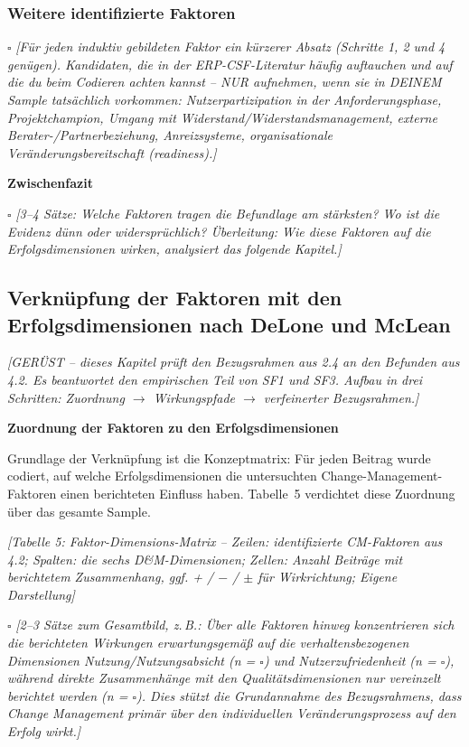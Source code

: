 \subsubsection{Weitere identifizierte Faktoren}

$\square$ \textit{[F\"ur jeden induktiv gebildeten Faktor ein k\"urzerer Absatz (Schritte 1, 2 und 4 gen\"ugen). Kandidaten, die in der ERP-CSF-Literatur h\"aufig auftauchen und auf die du beim Codieren achten kannst -- NUR aufnehmen, wenn sie in DEINEM Sample tats\"achlich vorkommen: Nutzerpartizipation in der Anforderungsphase, Projektchampion, Umgang mit Widerstand/Widerstandsmanagement, externe Berater-/Partnerbeziehung, Anreizsysteme, organisationale Ver\"anderungsbereitschaft (readiness).]}

\textbf{Zwischenfazit}

$\square$ \textit{[3--4 S\"atze: Welche Faktoren tragen die Befundlage am st\"arksten? Wo ist die Evidenz d\"unn oder widerspr\"uchlich? \"Uberleitung: Wie diese Faktoren auf die Erfolgsdimensionen wirken, analysiert das folgende Kapitel.]}

\subsection{Verkn\"upfung der Faktoren mit den Erfolgsdimensionen nach DeLone und McLean}

\textit{[GER\"UST -- dieses Kapitel pr\"uft den Bezugsrahmen aus 2.4 an den Befunden aus 4.2. Es beantwortet den empirischen Teil von SF1 und SF3. Aufbau in drei Schritten: Zuordnung $\rightarrow$ Wirkungspfade $\rightarrow$ verfeinerter Bezugsrahmen.]}

\textbf{Zuordnung der Faktoren zu den Erfolgsdimensionen}

Grundlage der Verkn\"upfung ist die Konzeptmatrix: F\"ur jeden Beitrag wurde codiert, auf welche Erfolgsdimensionen die untersuchten Change-Management-Faktoren einen berichteten Einfluss haben. Tabelle~5 verdichtet diese Zuordnung \"uber das gesamte Sample.

\textit{[Tabelle 5: Faktor-Dimensions-Matrix -- Zeilen: identifizierte CM-Faktoren aus 4.2; Spalten: die sechs D\&M-Dimensionen; Zellen: Anzahl Beitr\"age mit berichtetem Zusammenhang, ggf. + / $-$ / $\pm$ f\"ur Wirkrichtung; Eigene Darstellung]}

$\square$ \textit{[2--3 S\"atze zum Gesamtbild, z.\,B.: \"Uber alle Faktoren hinweg konzentrieren sich die berichteten Wirkungen erwartungsgem\"a\ss{} auf die verhaltensbezogenen Dimensionen Nutzung/Nutzungsabsicht (n = $\square$) und Nutzerzufriedenheit (n = $\square$), w\"ahrend direkte Zusammenh\"ange mit den Qualit\"atsdimensionen nur vereinzelt berichtet werden (n = $\square$). Dies st\"utzt die Grundannahme des Bezugsrahmens, dass Change Management prim\"ar \"uber den individuellen Ver\"anderungsprozess auf den Erfolg wirkt.]}

